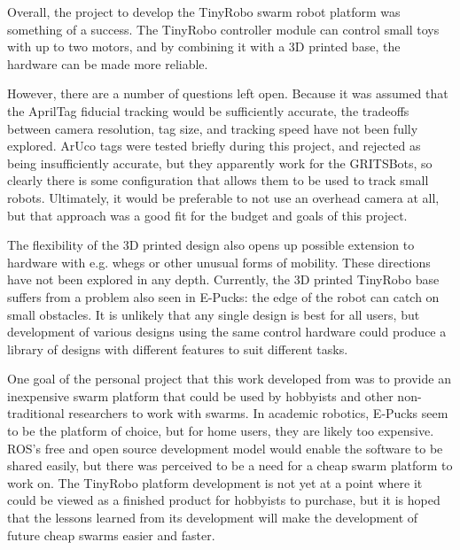Overall, the project to develop the TinyRobo swarm robot platform was something of a success. 
The TinyRobo controller module can control small toys with up to two motors, and by combining it with a 3D printed base, the hardware can be made more reliable. 

However, there are a number of questions left open.
Because it was assumed that the AprilTag fiducial tracking would be sufficiently accurate, the tradeoffs between camera resolution, tag size, and tracking speed have not been fully explored. 
ArUco tags were tested briefly during this project, and rejected as being insufficiently accurate, but they apparently work for the GRITSBots, so clearly there is some configuration that allows them to be used to track small robots. 
Ultimately, it would be preferable to not use an overhead camera at all, but that approach was a good fit for the budget and goals of this project. 

The flexibility of the 3D printed design also opens up possible extension to hardware with e.g. whegs or other unusual forms of mobility. 
These directions have not been explored in any depth.
Currently, the 3D printed TinyRobo base suffers from a problem also seen in E-Pucks: the edge of the robot can catch on small obstacles. 
It is unlikely that any single design is best for all users, but development of various designs using the same control hardware could produce a library of designs with different features to suit different tasks. 
 
One goal of the personal project that this work developed from was to provide an inexpensive swarm platform that could be used by hobbyists and other non-traditional researchers to work with swarms. 
In academic robotics, E-Pucks seem to be the platform of choice, but for home users, they are likely too expensive. 
ROS's free and open source development model would enable the software to be shared easily, but there was perceived to be a need for a cheap swarm platform to work on. 
The TinyRobo platform development is not yet at a point where it could be viewed as a finished product for hobbyists to purchase, but it is hoped that the lessons learned from its development will make the development of future cheap swarms easier and faster. 


